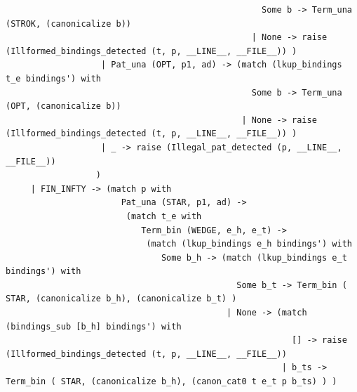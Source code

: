 \documentclass[12pt]{article}
\begin{document}
\begin{tiny}
\begin{verbatim}
                                                   Some b -> Term_una (STROK, (canonicalize b))
                                                 | None -> raise (Illformed_bindings_detected (t, p, __LINE__, __FILE__)) )
                   | Pat_una (OPT, p1, ad) -> (match (lkup_bindings t_e bindings') with
                                                 Some b -> Term_una (OPT, (canonicalize b))
                                               | None -> raise (Illformed_bindings_detected (t, p, __LINE__, __FILE__)) )
                   | _ -> raise (Illegal_pat_detected (p, __LINE__, __FILE__))
                  )
     | FIN_INFTY -> (match p with
                       Pat_una (STAR, p1, ad) ->
                        (match t_e with
                           Term_bin (WEDGE, e_h, e_t) ->
                            (match (lkup_bindings e_h bindings') with
                               Some b_h -> (match (lkup_bindings e_t bindings') with
                                              Some b_t -> Term_bin ( STAR, (canonicalize b_h), (canonicalize b_t) )
                                            | None -> (match (bindings_sub [b_h] bindings') with
                                                         [] -> raise (Illformed_bindings_detected (t, p, __LINE__, __FILE__))
                                                       | b_ts -> Term_bin ( STAR, (canonicalize b_h), (canon_cat0 t e_t p b_ts) ) )
                                                       

\end{verbatim}
\end{tiny}
\end{document}
